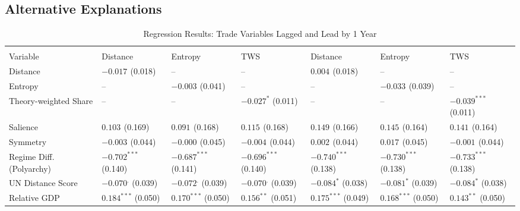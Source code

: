 \documentclass[12pt]{article}
\begin{document}
\subsection{Alternative Explanations}
\begin{table}[htbp]
\scriptsize
\centering
\caption{Regression Results: Trade Variables Lagged and Lead by 1 Year}
\renewcommand{\arraystretch}{1.2}
\begin{tabularx}{\textwidth}{l
  >{\centering\arraybackslash}X
  >{\centering\arraybackslash}X
  >{\centering\arraybackslash}X
  >{\centering\arraybackslash}X
  >{\centering\arraybackslash}X
  >{\centering\arraybackslash}X}
\toprule
\rowcolor{gray!20}
& \multicolumn{3}{c}{Lagged (t$-$1)} & \multicolumn{3}{c}{Lead (t$+$1)} \\
\cmidrule(lr){2-4} \cmidrule(lr){5-7}
Variable & Distance & Entropy & TWS & Distance & Entropy & TWS \\
\midrule
Distance                & $-0.017^{}$ (0.018) & --                  & --                  & $0.004^{}$ (0.018)  & --                  & --                  \\
Entropy                 & --                  & $-0.003^{}$ (0.041) & --                  & --                  & $-0.033^{}$ (0.039) & --                  \\
Theory-weighted Share   & --                  & --                  & $-0.027^{*}$ (0.011) & --                  & --                  & $-0.039^{***}$ (0.011) \\
Salience                & $0.103^{}$ (0.169)  & $0.091^{}$ (0.168)  & $0.115^{}$ (0.168)  & $0.149^{}$ (0.166)  & $0.145^{}$ (0.164)  & $0.141^{}$ (0.164)  \\
Symmetry                & $-0.003^{}$ (0.044) & $-0.000^{}$ (0.045) & $-0.004^{}$ (0.044) & $0.002^{}$ (0.044)  & $0.017^{}$ (0.045)  & $-0.001^{}$ (0.044) \\
Regime Diff. (Polyarchy)& $-0.702^{***}$ (0.140) & $-0.687^{***}$ (0.141) & $-0.696^{***}$ (0.140) & $-0.740^{***}$ (0.138) & $-0.730^{***}$ (0.138) & $-0.733^{***}$ (0.138) \\
UN Distance Score       & $-0.070^{.}$ (0.039) & $-0.072^{.}$ (0.039) & $-0.070^{.}$ (0.039) & $-0.084^{*}$ (0.038) & $-0.081^{*}$ (0.039) & $-0.084^{*}$ (0.038) \\
Relative GDP            & $0.184^{***}$ (0.050) & $0.170^{***}$ (0.050) & $0.156^{**}$ (0.051) & $0.175^{***}$ (0.049) & $0.168^{***}$ (0.050) & $0.143^{**}$ (0.050) \\

\end{tabularx}
\end{table}
\end{document}

